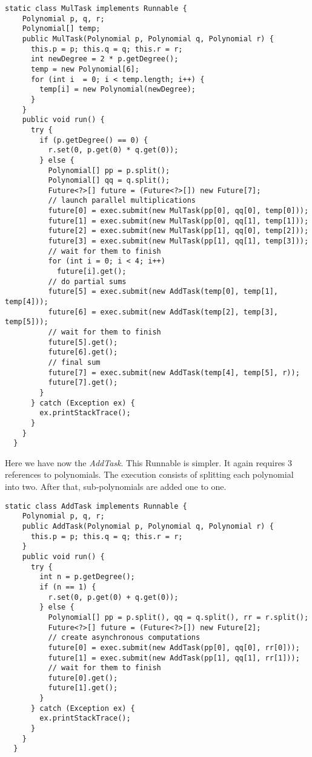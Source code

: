 \begin{lstlisting}[style=numbers]
  static class MulTask implements Runnable {
    Polynomial p, q, r;
    Polynomial[] temp;
    public MulTask(Polynomial p, Polynomial q, Polynomial r) {
      this.p = p; this.q = q; this.r = r;
      int newDegree = 2 * p.getDegree();
      temp = new Polynomial[6];
      for (int i  = 0; i < temp.length; i++) {
        temp[i] = new Polynomial(newDegree);
      }
    }
    public void run() {
      try {
        if (p.getDegree() == 0) {
          r.set(0, p.get(0) * q.get(0));
        } else {
          Polynomial[] pp = p.split();
          Polynomial[] qq = q.split();
          Future<?>[] future = (Future<?>[]) new Future[7];
          // launch parallel multiplications
          future[0] = exec.submit(new MulTask(pp[0], qq[0], temp[0]));
          future[1] = exec.submit(new MulTask(pp[0], qq[1], temp[1]));
          future[2] = exec.submit(new MulTask(pp[1], qq[0], temp[2]));
          future[3] = exec.submit(new MulTask(pp[1], qq[1], temp[3]));
          // wait for them to finish
          for (int i = 0; i < 4; i++)
            future[i].get();
          // do partial sums
          future[5] = exec.submit(new AddTask(temp[0], temp[1], temp[4]));
          future[6] = exec.submit(new AddTask(temp[2], temp[3], temp[5]));
          // wait for them to finish
          future[5].get();
          future[6].get();
          // final sum
          future[7] = exec.submit(new AddTask(temp[4], temp[5], r));
          future[7].get();
        }
      } catch (Exception ex) {
        ex.printStackTrace();
      }
    }
  }
\end{lstlisting}
\hfill
\par
Here we have now the \textit{AddTask}. This Runnable is simpler. It again
requires $3$ references to polynomials. The execution consists of splitting each
polynomial into two. After that, sub-polynomials are added one to one. 
\par
\hfill
\begin{lstlisting}[style=numbers]
  static class AddTask implements Runnable {
    Polynomial p, q, r;
    public AddTask(Polynomial p, Polynomial q, Polynomial r) {
      this.p = p; this.q = q; this.r = r;
    }
    public void run() {
      try {
        int n = p.getDegree();
        if (n == 1) {
          r.set(0, p.get(0) + q.get(0));
        } else {
          Polynomial[] pp = p.split(), qq = q.split(), rr = r.split();
          Future<?>[] future = (Future<?>[]) new Future[2];
          // create asynchronous computations
          future[0] = exec.submit(new AddTask(pp[0], qq[0], rr[0]));
          future[1] = exec.submit(new AddTask(pp[1], qq[1], rr[1]));
          // wait for them to finish
          future[0].get();
          future[1].get();
        }
      } catch (Exception ex) {
        ex.printStackTrace();
      }
    }
  }
\end{lstlisting}
\hfill
\par
